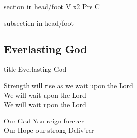 \documentclass{beamer}
\begin{document}
{
{ 
 {
 \begin{beamercolorbox}[ht=4.5ex,dp=1.5ex,%
      leftskip=.3cm,rightskip=.3cm plus1fil]{section in head/foot}
 \fontsize{12}{25}\selectfont 
\hyperlink{Everlasting God['Strength will rise']V}{V}
\hyperlink{Everlasting God['Strength will rise']x2}{x2}
\hyperlink{Everlasting God['Strength will rise']Pre}{Pre}
\hyperlink{Everlasting God['Strength will rise']C}{C}
 
 \end{beamercolorbox}%
  \begin{beamercolorbox}[ht=2.5ex,dp=1.125ex,%
   leftskip=.3cm,rightskip=.3cm plus1fil]{subsection in head/foot}
   \insertauthor
 \end{beamercolorbox}%
 }
}
\subsection{ Everlasting God }

\hypertarget{Everlasting God['Strength will rise']}{}
\begin{frame}{}
 \vfill
  \centering
  \begin{beamercolorbox}[sep=8pt,center,shadow=true,rounded=true]{title}
    Everlasting God    
  \end{beamercolorbox}
  \vfill
\end{frame}

\hypertarget{Everlasting God['Strength will rise']V}{}
\begin{frame}{}
\fontsize{ 18 }{ 23 }\selectfont

Strength will rise as we wait upon the Lord\\ 
We will wait upon the Lord\\ 
We will wait upon the Lord 

\end{frame}

\hypertarget{Everlasting God['Strength will rise']x2}{}
\begin{frame}{}
\fontsize{ 18 }{ 23 }\selectfont

 

\end{frame}

\hypertarget{Everlasting God['Strength will rise']Pre}{}
\begin{frame}{}
\fontsize{ 18 }{ 23 }\selectfont

Our God You reign forever\\ 
Our Hope our strong Deliv'rer 


\end{frame}}
\end{document}
